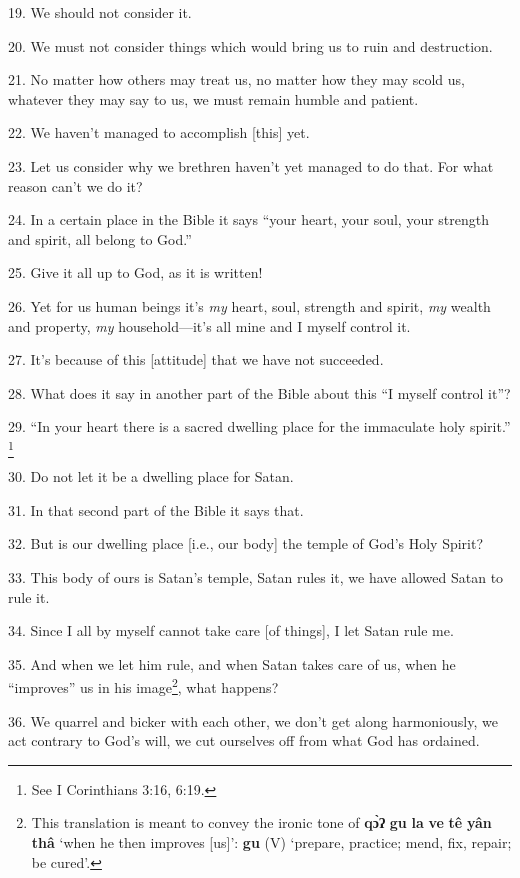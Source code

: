 19. We should not consider it.

20. We must not consider things which would bring us to ruin and destruction.

21. No matter how others may treat us, no matter how they may scold us, whatever
they may say to us, we must remain humble and patient.

22. We haven't managed to accomplish [this] yet.

23. Let us consider why we brethren haven't yet managed to do that. For what reason
can't we do it?

24. In a certain place in the Bible it says ``your heart, your soul, your strength
and spirit, all belong to God.''

25. Give it all up to God, as it is written!

26. Yet for us human beings it's \textit{my} heart, soul, strength and spirit,
\textit{my} wealth and property, \textit{my }household---it's all mine and I myself
control it.

27. It's because of this [attitude] that we have not succeeded.

28. What does it say in another part of the Bible about this ``I myself control
it''?

29. ``In your heart there is a sacred dwelling place for the immaculate holy spirit.''
\footnote{See I Corinthians 3:16, 6:19.}

30. Do not let it be a dwelling place for Satan.

31. In that second part of the Bible it says that.

32. But is our dwelling place [i.e., our body] the temple of God's Holy Spirit?

33. This body of ours is Satan's temple, Satan rules it, we have allowed Satan
to rule it.

34. Since I all by myself cannot take care [of things], I let Satan rule me.

35. And when we let him rule, and when Satan takes care of us, when he ``improves''
us in his image\footnote{This translation is meant to convey the ironic tone of \textbf{qɔ̀ʔ} \textbf{gu} \textbf{la} \textbf{ve} \textbf{tê} \textbf{yân} \textbf{thâ} `when he then improves [us]': \textbf{gu} (V) `prepare, practice; mend, fix, repair; be cured'.}, what happens?

36. We quarrel and bicker with each other, we don't get along harmoniously, we
act contrary to God's will, we cut ourselves off from what God has ordained.

